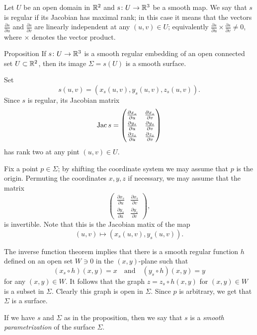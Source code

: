 Let $U$ be an open domain in $\mathbb{R}^2$ and $s\colon U\to \mathbb{R}^3$ be a smooth map.
We say that $s$ is regular if its Jacobian has maximal rank;
in this case it means that the vectors $\tfrac{\partial s}{\partial u}$ and $\tfrac{\partial s}{\partial v}$ are linearly independent at any $(u,v)\in U$;
equivalently $\tfrac{\partial s}{\partial u}\times\tfrac{\partial s}{\partial v}\ne 0$, where $\times$ denotes the vector product.

\begin{thm}{Proposition}\label{prop:graph-chart}
If $s\colon U\to \mathbb{R}^3$ is a smooth regular embedding %
of an open connected set $U\subset \mathbb{R}^2$, then its image $\Sigma=s(U)$ is a smooth surface.
\end{thm}

Set 
\[s(u,v)=(x_s(u,v),y_s(u,v),z_s(u,v)).\]
Since $s$ is regular, its Jacobian matrix
\[\Jac s=
\renewcommand\arraystretch{1.3}
\begin{pmatrix}
\tfrac{\partial x_s}{\partial u}&\tfrac{\partial x_s}{\partial v}\\
\tfrac{\partial y_s}{\partial u}&\tfrac{\partial y_s}{\partial v}\\
\tfrac{\partial z_s}{\partial u}&\tfrac{\partial z_s}{\partial v}
\end{pmatrix}
\]
has rank two at any pint $(u,v)\in U$.

Fix a point $p\in \Sigma$; by shifting the coordinate system we may assume that $p$ is the origin.
Permuting the coordinates $x,y,z$ if necessary, we may assume that 
the matrix 
\[
\renewcommand\arraystretch{1.3}
\begin{pmatrix}
\tfrac{\partial x_s}{\partial u}&\tfrac{\partial x_s}{\partial v}\\
\tfrac{\partial y_s}{\partial u}&\tfrac{\partial y_s}{\partial v}
\end{pmatrix},
\] 
is invertible.
Note that this is the Jacobian matix of the map
\[(u,v)\mapsto (x_s(u,v),y_s(u,v)).\]

The inverse function theorem implies that there is a smooth regular function $h$ defined on an open set $W\ni 0$ in the $(x,y)$-plane
such that 
\[(x_s\circ h)(x,y)=x\quad\text{and}\quad (y_s\circ h)(x,y)=y\]
for any $(x,y)\in W$.
It follows that the graph $z=z_s\circ h(x,y)$ for $(x,y)\in W$ is a subset in $\Sigma$.
Clearly this graph is open in $\Sigma$. %
Since $p$ is arbitrary, we get that $\Sigma$ is a surface.
\qeds

If we have $s$ and $\Sigma$ as in the proposition, then we say that $s$ is a \emph{smooth parametrization} of the surface $\Sigma$. 

